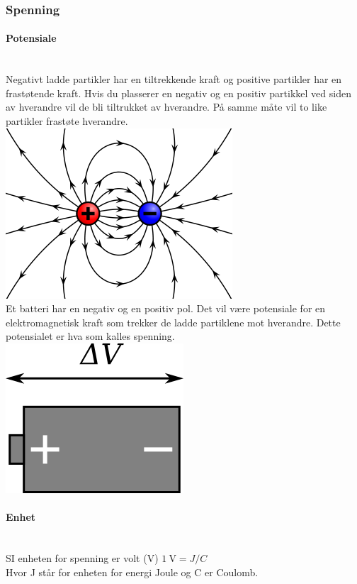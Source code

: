 \subsubsection{Spenning}
\paragraph{Potensiale} \mbox{} \\
Negativt ladde partikler har en tiltrekkende kraft
og positive partikler har en frastøtende kraft.
Hvis du plasserer en negativ og en positiv partikkel ved siden av
hverandre vil de bli tiltrukket av hverandre. På samme måte
vil to like partikler frastøte hverandre.
\\
\includegraphics[scale=0.5]{./img/charge}
\\

Et batteri har en negativ og en positiv pol.
Det vil være potensiale for en elektromagnetisk kraft
som trekker de ladde partiklene mot hverandre.
Dette potensialet er hva som kalles spenning.
\\
\includegraphics[scale=0.5]{./img/battery}

\paragraph{Enhet} \mbox{} \\
SI enheten for spenning er volt (V) \hfill $\SI{1}{\volt} = J/C$\\
Hvor J står for enheten for energi Joule og C er Coulomb.
